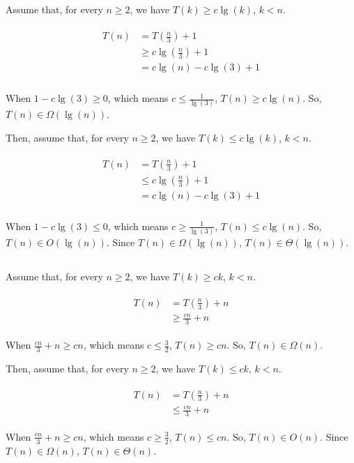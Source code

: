 \documentclass[paper=a4, fontsize=11pt]{scrartcl} %
\numberwithin{equation}{section} %
\numberwithin{figure}{section} %
\numberwithin{table}{section} %
\begin{document}
\subsection{}

Assume that, for every $n\geq 2$, we have $T(k)\geq c\lg(k)$, $k<n$.

\begin{align}
\begin{split}
T(n) &= T(\frac{n}{3})+1\\
&\geq c\lg(\frac{n}{3})+1\\
&= c\lg(n)-c\lg(3)+1\\
\end{split}
\end{align}

When $1-c\lg(3)\geq 0$, which means $c\leq\frac{1}{\lg(3)}$, $T(n)\geq c\lg(n)$.
So, $T(n)\in\Omega(\lg(n))$.

Then, assume that, for every $n\geq 2$, we have $T(k)\leq c\lg(k)$, $k<n$.

\begin{align}
\begin{split}
T(n) &= T(\frac{n}{3})+1\\
&\leq c\lg(\frac{n}{3})+1\\
&= c\lg(n)-c\lg(3)+1\\
\end{split}
\end{align}

When $1-c\lg(3)\leq 0$, which means $c\geq\frac{1}{\lg(3)}$, $T(n)\leq c\lg(n)$.
So, $T(n)\in O(\lg(n))$.
Since $T(n)\in\Omega(\lg(n))$, $T(n)\in\Theta(\lg(n))$.


\subsection{}

Assume that, for every $n\geq 2$, we have $T(k)\geq ck$, $k<n$.

\begin{align}
\begin{split}
T(n) &= T(\frac{n}{3})+n\\
&\geq \frac{cn}{3}+n
\end{split}
\end{align}

When $\frac{cn}{3}+n\geq cn$, which means $c\leq\frac{3}{2}$, $T(n)\geq cn$.
So, $T(n)\in\Omega(n)$.

Then, assume that, for every $n\geq 2$, we have $T(k)\leq ck$, $k<n$.

\begin{align}
\begin{split}
T(n) &= T(\frac{n}{3})+n\\
&\leq \frac{cn}{3}+n
\end{split}
\end{align}

When $\frac{cn}{3}+n\geq cn$, which means $c\geq\frac{3}{2}$, $T(n)\leq cn$.
So, $T(n)\in O(n)$.
Since $T(n)\in\Omega(n)$, $T(n)\in\Theta(n)$.


\end{document}
